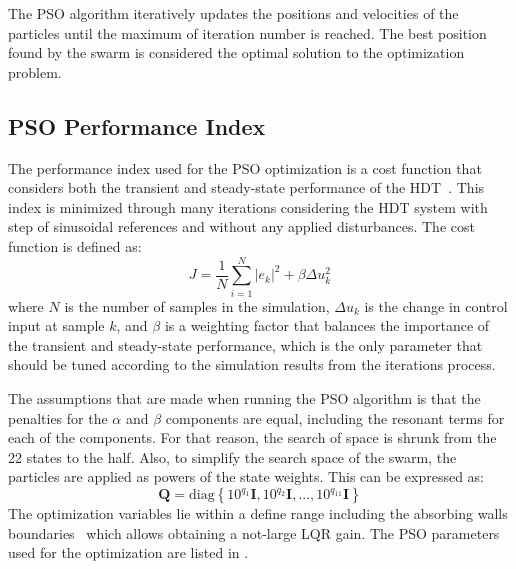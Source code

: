 The PSO algorithm iteratively updates the positions and velocities of the particles until the maximum of iteration number is reached. The best position found by the swarm is considered the optimal solution to the optimization problem.

\subsection{PSO Performance Index}

The performance index used for the PSO optimization is a cost function that considers both the transient and steady-state performance of the HDT~\cite{ufnalskiParticleSwarmOptimization2015}. This index is minimized through many iterations considering the HDT system with step of sinusoidal references and without any applied disturbances. The cost function is defined as:
\begin{equation}
    J = \dfrac{1}{N} \sum_{i=1}^{N} |e_k|^2 + \beta \Delta u_k^2
\end{equation}
where $N$ is the number of samples in the simulation, $\Delta u_k$ is the change in control input at sample $k$, and $\beta$ is a weighting factor that balances the importance of the transient and steady-state performance, which is the only parameter that should be tuned according to the simulation results from the iterations process.

The assumptions that are made when running the PSO algorithm is that the penalties for the $\alpha$ and $\beta$ components are equal, including the resonant terms for each of the components. For that reason, the search of space is shrunk from the 22 states to the half. Also, to simplify the search space of the swarm, the particles are applied as powers of the state weights. This can be expressed as:
\begin{equation}
    \mathbf{Q} = \text{diag}\left\{10^{q_1}\mathbf{I}, 10^{q_2}\mathbf{I}, ..., 10^{q_{11}}\mathbf{I}\right\}
\end{equation}
The optimization variables lie within a define range including the absorbing walls boundaries~\cite{robinsonParticleSwarmOptimization2004} which allows obtaining a not-large LQR gain. The PSO parameters used for the optimization are listed in .

